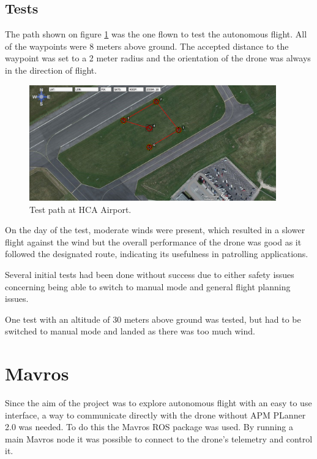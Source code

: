 \subsection{Tests}
The path shown on figure \ref{fig:HCAPath} was the one flown to test the autonomous flight.
All of the waypoints were 8 meters above ground. The accepted distance to the waypoint was set to a 2 meter
radius and the orientation of the drone was always in the direction of flight.

\begin{figure}[H]
  \centering
    \includegraphics[width=0.95\textwidth]{./Images/HCAPath}
  \caption{Test path at HCA Airport.}
  \label{fig:HCAPath}
\end{figure}

On the day of the test, moderate winds were present, which resulted in a slower flight against the wind but the
overall performance of the drone was good as it followed the designated route,
indicating its usefulness in patrolling applications.

Several initial tests had been done without success due to either safety issues concerning being
able to switch to manual mode and general flight planning issues.

One test with an altitude of 30 meters above ground was tested, but had to be switched to manual
mode and landed as there was too much wind.
 
\section{Mavros}
Since the aim of the project was to explore autonomous flight with an easy to use interface, a way
to communicate directly with the drone without APM PLanner 2.0 was needed. To do this the Mavros
\cite{Ref:Mavros} ROS package was used. By running a main Mavros node it was possible to connect to
the drone's telemetry and control it.

